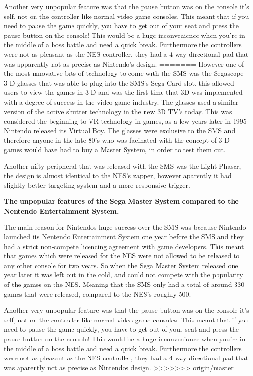 \documentclass{scrartcl}
\begin{document}
Another very unpopular feature was that the pause button was on the console it's self, not on the controller like normal video game consoles. This meant that if you need to pause the game quickly, you have to get out of your seat and press the pause button on the console! This would be a huge inconvenience when you're in the middle of a boss battle and need a quick break. Furthermore the controllers were not as pleasant as the NES controller, they had a 4 way directional pad that was apparently not as precise as Nintendo’s design.\cite{Weiss2009}
=======
However one of the most innovative bits of technology to come with the SMS was the Segascope 3-D glasses that was able to plug into the SMS's Sega Card slot, this allowed users to view the games in 3-D and was the first time that 3D was implemented with a degree of success in the video game industry. The glasses used a similar version of the active shutter technology in the new 3D TV's today.\cite{SegaScopeTech} This was considered the beginning to VR technology in games, as a few years later in 1995 Nintendo released its Virtual Boy. \cite{Workman} The glasses were exclusive to the SMS and therefore anyone in the late 80's who was facinated with the concept of 3-D games would have had to buy a Master System, in order to test them out.

Another nifty peripheral that was released with the SMS was the Light Phaser, the design is almost identical to the NES's zapper, however aparently it had slightly better targeting system and a more responsive trigger. 


\textbf{The unpopular features of the Sega Master System compared to the Nentendo Entertainment System.} \par

The main reason for Nintendos huge success over the SMS was because Nintendo launched its Nentendo Entertainment System one year before the SMS and they had a strict non-compete licencing agreement with game developers. This meant that games which were released for the NES were not allowed to be released to any other console for two years.\cite{Weiss2009} So when the Sega Master System released one year later it was left out in the cold, and could not compete with the popularity of the games on the NES. Meaning that the SMS only had a total of around 330 games that were released, compared to the NES's roughly 500. \cite{russell}

Another very unpopular feature was that the pause button was on the console it's self, not on the controller like normal video game consoles. This meant that if you need to pause the game quickly, you have to get out of your seat and press the pause button on the console! This would be a huge inconveniance when you're in the middle of a boss battle and need a quick break. Furthermore the controllers were not as pleasant as the NES controller, they had a 4 way directional pad that was aparently not as precise as Nintendos design.\cite{Weiss2009}
>>>>>>> origin/master
\end{document}
